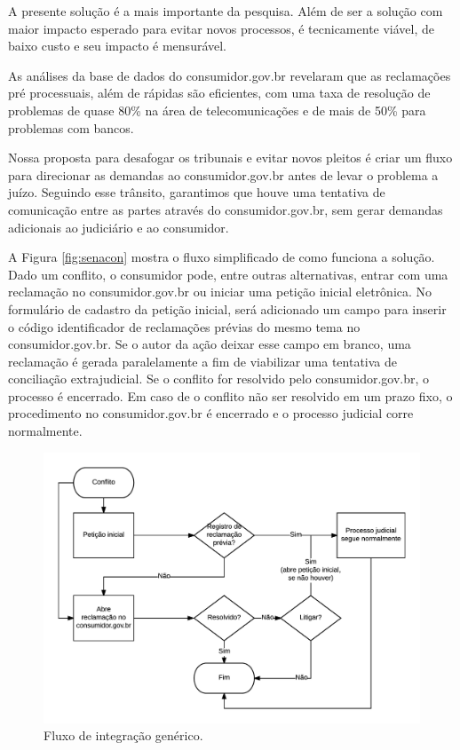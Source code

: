 \documentclass[]{report}
\begin{document}
A presente solução é a mais importante da pesquisa. Além de ser a
solução com maior impacto esperado para evitar novos processos, é
tecnicamente viável, de baixo custo e seu impacto é mensurável.

As análises da base de dados do consumidor.gov.br revelaram que as
reclamações pré processuais, além de rápidas são eficientes, com uma
taxa de resolução de problemas de quase 80\% na área de telecomunicações
e de mais de 50\% para problemas com bancos.

Nossa proposta para desafogar os tribunais e evitar novos pleitos é
criar um fluxo para direcionar as demandas ao consumidor.gov.br antes de
levar o problema a juízo. Seguindo esse trânsito, garantimos que houve
uma tentativa de comunicação entre as partes através do
consumidor.gov.br, sem gerar demandas adicionais ao judiciário e ao
consumidor.

A Figura \ref{fig:senacon} mostra o fluxo simplificado de como funciona
a solução. Dado um conflito, o consumidor pode, entre outras
alternativas, entrar com uma reclamação no consumidor.gov.br ou iniciar
uma petição inicial eletrônica. No formulário de cadastro da petição
inicial, será adicionado um campo para inserir o código identificador de
reclamações prévias do mesmo tema no consumidor.gov.br. Se o autor da
ação deixar esse campo em branco, uma reclamação é gerada paralelamente
a fim de viabilizar uma tentativa de conciliação extrajudicial. Se o
conflito for resolvido pelo consumidor.gov.br, o processo é encerrado.
Em caso de o conflito não ser resolvido em um prazo fixo, o procedimento
no consumidor.gov.br é encerrado e o processo judicial corre
normalmente.

\begin{figure}[htbp]
\centering
\includegraphics{imgs/senacon.png}
\caption{Fluxo de integração genérico.}\label{senacon}
\end{figure}
\end{document}
